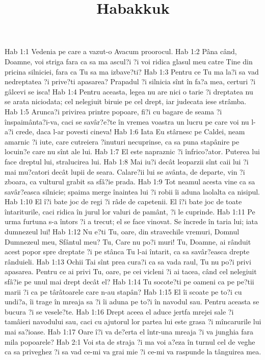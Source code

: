 

\title{Habakkuk}

Hab 1:1  Vedenia pe care a vazut-o Avacum proorocul.
Hab 1:2  Pâna când, Doamne, voi striga fara ca sa ma ascul?i ?i voi ridica glasul meu catre Tine din pricina silniciei, fara ca Tu sa ma izbave?ti?
Hab 1:3  Pentru ce Tu ma la?i sa vad nedreptatea ?i prive?ti apasarea? Prapadul ?i silnicia sînt în fa?a mea, certuri ?i gâlcevi se isca!
Hab 1:4  Pentru aceasta, legea nu are nici o tarie ?i dreptatea nu se arata niciodata; cel nelegiuit biruie pe cel drept, iar judecata iese strâmba.
Hab 1:5  Arunca?i privirea printre popoare, fi?i cu bagare de seama ?i înspaimânta?i-va, caci se savâr?e?te în vremea voastra un lucru pe care voi nu l-a?i crede, daca l-ar povesti cineva!
Hab 1:6  Iata Eu stârnesc pe Caldei, neam amarnic ?i iute, care cutreiera ?inuturi necuprinse, ca sa puna stapânire pe locuin?e care nu sînt ale lui.
Hab 1:7  El este napraznic ?i înfrico?ator. Puterea lui face dreptul lui, stralucirea lui.
Hab 1:8  Mai iu?i decât leoparzii sînt caii lui ?i mai mu?catori decât lupii de seara. Calare?ii lui se avânta, de departe, vin ?i zboara, ca vulturul grabit sa sfâ?ie prada.
Hab 1:9  Tot neamul acesta vine ca sa savâr?easca silnicie; spaima merge înaintea lui ?i robii îi aduna laolalta ca nisipul.
Hab 1:10  El î?i bate joc de regi ?i râde de capetenii. El î?i bate joc de toate întariturile, caci ridica în jurul lor valuri de pamânt, ?i le cuprinde.
Hab 1:11  Pe urma furtuna s-a întors ?i a trecut; el se face vinovat. Se încrede în taria lui; iata dumnezeul lui!
Hab 1:12  Nu e?ti Tu, oare, din stravechile vremuri, Domnul Dumnezeul meu, Sfântul meu? Tu, Care nu po?i muri! Tu, Doamne, ai rânduit acest popor spre dreptate ?i pe stânca Tu l-ai întarit, ca sa savâr?easca drepte rânduieli.
Hab 1:13  Ochii Tai sînt prea cura?i ca sa vada raul, Tu nu po?i privi apasarea. Pentru ce ai privi Tu, oare, pe cei vicleni ?i ai tacea, când cel nelegiuit sfâ?ie pe unul mai drept decât el?
Hab 1:14  Tu socote?ti pe oameni ca pe pe?tii marii ?i ca pe târâtoarele care n-au stapân?
Hab 1:15  El îi scoate pe to?i cu undi?a, îi trage în mreaja sa ?i îi aduna pe to?i în navodul sau. Pentru aceasta se bucura ?i se vesele?te.
Hab 1:16  Drept aceea el aduce jertfa mrejei sale ?i tamâieri navodului sau, caci cu ajutorul lor partea lui este grasa ?i mîncarurile lui mai sa?ioase.
Hab 1:17  Oare î?i va de?erta el într-una mreaja ?i va junghia fara mila popoarele?
Hab 2:1  Voi sta de straja ?i ma voi a?eza în turnul cel de veghe ca sa priveghez ?i sa vad ce-mi va grai mie ?i ce-mi va raspunde la tânguirea mea.
